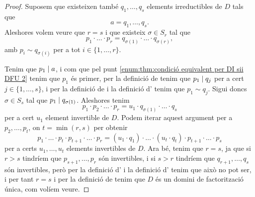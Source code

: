 \documentclass[../Apunts.tex]{subfiles}
\begin{document}
\begin{theorem}
\begin{proof}
			Suposem que existeixen també \(q_{1},\dots,q_{s}\) elements irreductibles de \(D\) tals que
			\[a=q_{1},\dots,q_{s}.\]
			Aleshores volem veure que \(r=s\) i que existeix \(\sigma\in S_{r}\) tal que
			\[p_{1}\cdot\ldots\cdot p_{r}=q_{\sigma(1)}\cdot\ldots\cdot q_{\sigma(r)},\]
			amb \(p_{i}\sim q_{\sigma(i)}\) per a tot \(i\in\{1,\dots,r\}\).
			
			Tenim que \(p_{1}\mathrel{|} a\), i com que pel punt \eqref{enum:thm:condició equivalent per DI sii DFU 2} tenim que \(p_{1}\) és primer, per la definició de  tenim que \(p_{1}\mathrel{|} q_{j}\) per a cert \(j\in\{1,\dots,s\}\), i per la definició de  i la definició d' tenim que \(p_{1}\sim q_{j}\). Sigui doncs \(\sigma\in S_{s}\) tal que \(p_{1}\mathrel{|} q_{\sigma(1)}\). Aleshores tenim
			\[p_{1}\cdot p_{2}\cdot\ldots\cdot p_{r}=u_{1}\cdot q_{\sigma(1)}\cdot\ldots\cdot q_{s}\]
			per a cert \(u_{1}\) element invertible de \(D\). Podem iterar aquest argument per a \(p_{2},\dots,p_{t}\), on \(t=\min(r,s)\) per obtenir
			\[p_{1}\cdot\ldots\cdot p_{t}\cdot p_{t+1}\cdot\ldots\cdot p_{r}=(u_{1}\cdot q_{1})\cdot\ldots\cdot(u_{t}\cdot q_{t})\cdot p_{t+1}\cdot\ldots \cdot p_{s}\]
			per a certs \(u_{1},\dots, u_{t}\) elements invertibles de \(D\). Ara bé, tenim que \(r=s\), ja que si \(r>s\) tindríem que \(p_{s+1},\dots,p_{r}\) són invertibles, i si \(s>r\) tindríem que \(q_{r+1},\dots,q_{s}\) són invertibles, però per la definició d' i la definició d' tenim que això no pot ser, i per tant \(r=s\) i per la definició de  tenim que \(D\) és un domini de factorització única, com volíem veure.
		\end{proof}
	\end{theorem}
\end{document}
